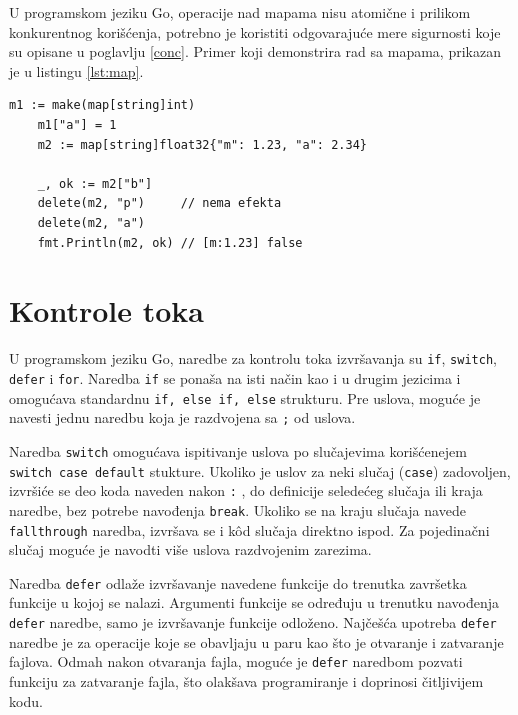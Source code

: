 \documentclass[12pt,oneside]{memoir}
\begin{document}
U programskom jeziku Go, operacije nad mapama nisu atomične i prilikom konkurentnog korišćenja, potrebno je koristiti odgovarajuće mere sigurnosti koje su opisane u poglavlju \ref{conc}. Primer koji demonstrira rad sa mapama, prikazan je u listingu \ref{lst:map}.

\begin{center}
\begin{lstlisting}[caption=Primer koji demonstrira rad sa mapama, label={lst:map},  backgroundcolor=\color{background}]
	m1 := make(map[string]int)
	m1["a"] = 1
	m2 := map[string]float32{"m": 1.23, "a": 2.34}
	
	_, ok := m2["b"]
	delete(m2, "p")		// nema efekta
	delete(m2, "a")
	fmt.Println(m2, ok) // [m:1.23] false
\end{lstlisting}
\end{center}

\section{Kontrole toka}

U programskom jeziku Go, naredbe za kontrolu toka izvršavanja su \texttt{if}, \texttt{switch}, \texttt{defer} i \texttt{for}. Naredba \texttt{if} se ponaša na isti način kao i u drugim jezicima i omogućava standardnu \texttt{if, else if, else} strukturu. Pre uslova, moguće je navesti jednu naredbu koja je razdvojena sa \texttt{;} od uslova. 

Naredba \texttt{switch} omogućava ispitivanje uslova po slučajevima korišćenejem \texttt{switch case default} stukture. Ukoliko je uslov za neki slučaj (\texttt{case}) zadovoljen, izvršiće se deo koda naveden nakon \texttt{:} , do definicije seledećeg slučaja ili kraja naredbe, bez potrebe navođenja \texttt{break}. Ukoliko se na kraju slučaja navede \texttt{fallthrough} naredba, izvršava se i k\^{o}d slučaja direktno ispod. Za pojedinačni slučaj moguće je navodti više uslova razdvojenim zarezima. 

Naredba \texttt{defer} odlaže izvršavanje navedene funkcije do trenutka završetka funkcije u kojoj se nalazi. Argumenti funkcije se određuju u trenutku navođenja \texttt{defer} naredbe, samo je  izvršavanje funkcije odloženo. Najčešća upotreba \texttt{defer} naredbe je za operacije koje se obavljaju u paru kao što je otvaranje i zatvaranje fajlova. Odmah nakon otvaranja fajla, moguće je \texttt{defer} naredbom pozvati funkciju za zatvaranje fajla, što olakšava programiranje i doprinosi čitljivijem kodu.
\end{document}
